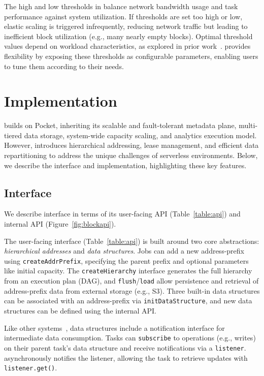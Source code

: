  The high and low thresholds in \jiffy balance network bandwidth usage and task performance against system utilization. If thresholds are set too high or low, elastic scaling is triggered infrequently, reducing network traffic but leading to inefficient block utilization (e.g., many nearly empty blocks). Optimal threshold values depend on workload characteristics, as explored in prior work~\cite{mongo-shard, ceph-shard}. \jiffy provides flexibility by exposing these thresholds as configurable parameters, enabling users to tune them according to their needs.

\section{\jiffy Implementation}
\label{sec:jiffyimplementation}

\jiffy builds on Pocket, inheriting its scalable and fault-tolerant metadata plane, multi-tiered data storage, system-wide capacity scaling, and analytics execution model. However, \jiffy introduces hierarchical addressing, lease management, and efficient data repartitioning to address the unique challenges of serverless environments. Below, we describe the \jiffy interface and implementation, highlighting these key features.

\subsection{\jiffy Interface}
\label{ssec:jiffyapi}


We describe \jiffy interface in terms of its user-facing API (Table~\ref{table:api}) and internal API (Figure~\ref{fig:blockapi}).

 The user-facing interface (Table~\ref{table:api}) is built around two core abstractions: \textit{hierarchical addresses} and \textit{data structures}. Jobs can add a new address-prefix using \texttt{createAddrPrefix}, specifying the parent prefix and optional parameters like initial capacity. The \texttt{createHierarchy} interface generates the full hierarchy from an execution plan (DAG), and \texttt{flush}/\texttt{load} allow persistence and retrieval of address-prefix data from external storage (e.g., S3). Three built-in data structures can be associated with an address-prefix via \texttt{initDataStructure}, and new data structures can be defined using the internal API.

Like other systems~\cite{redis, sns}, data structures include a notification interface for intermediate data consumption. Tasks can \texttt{subscribe} to operations (e.g., writes) on their parent task's data structure and receive notifications via a \texttt{listener}. \jiffy asynchronously notifies the listener, allowing the task to retrieve updates with \texttt{listener.get()}.

